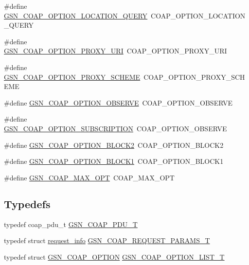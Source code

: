 \begin{DoxyCompactItemize}
\#define \hyperlink{a00538_acc7e9240a1bd5c13834932086226047b}{GSN\_\-COAP\_\-OPTION\_\-LOCATION\_\-QUERY}~COAP\_\-OPTION\_\-LOCATION\_\-QUERY
\item 
\#define \hyperlink{a00538_a6f3680e3a5fe2fb576732cfe97ce94bf}{GSN\_\-COAP\_\-OPTION\_\-PROXY\_\-URI}~COAP\_\-OPTION\_\-PROXY\_\-URI
\item 
\#define \hyperlink{a00538_a7962b386b8a2d20e7f2078b13990a9c1}{GSN\_\-COAP\_\-OPTION\_\-PROXY\_\-SCHEME}~COAP\_\-OPTION\_\-PROXY\_\-SCHEME
\item 
\#define \hyperlink{a00538_a32a86f9ec40bf427952ce5907c4b15c0}{GSN\_\-COAP\_\-OPTION\_\-OBSERVE}~COAP\_\-OPTION\_\-OBSERVE
\item 
\#define \hyperlink{a00538_a1806fdf67281ec7ce5653f42a6d74e4f}{GSN\_\-COAP\_\-OPTION\_\-SUBSCRIPTION}~COAP\_\-OPTION\_\-OBSERVE
\item 
\#define \hyperlink{a00538_af2202534af3538e184f5bf062ec59b5e}{GSN\_\-COAP\_\-OPTION\_\-BLOCK2}~COAP\_\-OPTION\_\-BLOCK2
\item 
\#define \hyperlink{a00538_a811ef0ca4fd74ece7dfa87b2b9bb6ca1}{GSN\_\-COAP\_\-OPTION\_\-BLOCK1}~COAP\_\-OPTION\_\-BLOCK1
\item 
\#define \hyperlink{a00538_ae122b98ec30473a73d0c6350bbffb76f}{GSN\_\-COAP\_\-MAX\_\-OPT}~COAP\_\-MAX\_\-OPT
\end{DoxyCompactItemize}
\subsection*{Typedefs}
\begin{DoxyCompactItemize}
\item 
typedef coap\_\-pdu\_\-t \hyperlink{a00538_afde87a99bfaad4a8beac3df27a309976}{GSN\_\-COAP\_\-PDU\_\-T}
\item 
typedef struct \hyperlink{a00456}{request\_\-info} \hyperlink{a00538_a8a243064c0dae8cfa5791f2ca3223eb9}{GSN\_\-COAP\_\-REQUEST\_\-PARAMS\_\-T}
\item 
typedef struct \hyperlink{a00041}{GSN\_\-COAP\_\-OPTION} \hyperlink{a00538_ad50259914e24245b799f66caf5819d83}{GSN\_\-COAP\_\-OPTION\_\-LIST\_\-T}
\end{DoxyCompactItemize}
